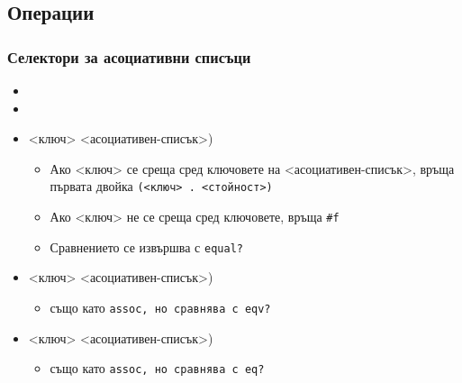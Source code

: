\documentclass[alsotrans]{beamerswitch}
\begin{document}
\subsection{Операции}

\begin{frame}[fragile]
  \frametitle{Селектори за асоциативни списъци}

  \begin{itemize}[<+->]
  \item {}
  \item {}
  \item {} <ключ> <асоциативен-списък>\tta)
    \begin{itemize}[<.->]
    \item Ако <ключ> се среща сред ключовете на <асоциативен-списък>,
      връща първата двойка \tt(<ключ> \tt. <стойност>\tt)
    \item Ако <ключ> не се среща сред ключовете, връща \tt{\#f}
    \item Сравнението се извършва с \tt{equal?}
    \end{itemize}
  \item {} <ключ> <асоциативен-списък>\tta)
    \begin{itemize}[<.->]
    \item също като \tt{assoc}, но сравнява с \tt{eqv?}
    \end{itemize}
  \item {} <ключ> <асоциативен-списък>\tta)
    \begin{itemize}[<.->]
    \item също като \tt{assoc}, но сравнява с \tt{eq?}
    \end{itemize}
  \end{itemize}
\end{frame}
\end{document}
